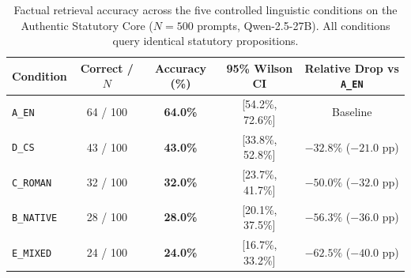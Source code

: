 \begin{table}[t]
\centering
\small
\begin{tabular}{lcccc}
\toprule
\textbf{Condition} & \textbf{Correct / $N$} & \textbf{Accuracy (\%)} & \textbf{95\% Wilson CI} & \textbf{Relative Drop vs \texttt{A\_EN}} \\
\midrule
\texttt{A\_EN} & 64 / 100 & \textbf{64.0\%} & [54.2\%, 72.6\%] & Baseline \\
\texttt{D\_CS} & 43 / 100 & \textbf{43.0\%} & [33.8\%, 52.8\%] & $-32.8\%$ ($-21.0$ pp) \\
\texttt{C\_ROMAN} & 32 / 100 & \textbf{32.0\%} & [23.7\%, 41.7\%] & $-50.0\%$ ($-32.0$ pp) \\
\texttt{B\_NATIVE} & 28 / 100 & \textbf{28.0\%} & [20.1\%, 37.5\%] & $-56.3\%$ ($-36.0$ pp) \\
\texttt{E\_MIXED} & 24 / 100 & \textbf{24.0\%} & [16.7\%, 33.2\%] & $-62.5\%$ ($-40.0$ pp) \\
\bottomrule
\end{tabular}
\caption{Factual retrieval accuracy across the five controlled linguistic conditions on the Authentic Statutory Core ($N=500$ prompts, Qwen-2.5-27B). All conditions query identical statutory propositions.}
\label{tab:accuracy_by_condition}
\end{table}
